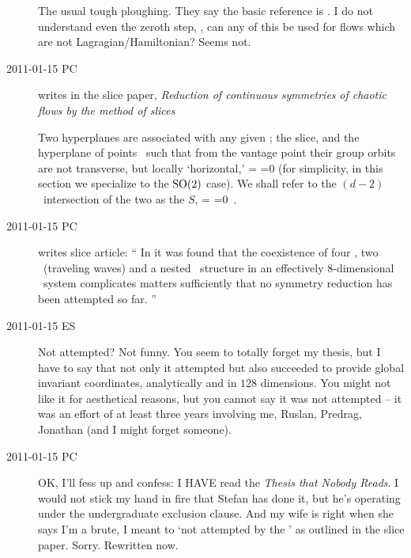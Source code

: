 \begin{description}
The usual tough ploughing. They say the basic reference is .
I do not understand even the zeroth step, \ie, can any of this be used for
flows which are not Lagragian/Hamiltonian? Seems not.

\item[2011-01-15 PC] writes in the slice paper,
{\emph{Reduction of continuous symmetries}} \emph{of chaotic flows by the
method of slices}

Two
hyperplanes are associated with  any given {\template} \slicep; the slice,
and the hyperplane of points \sspSing\ such that from
the {\template} vantage point their group orbits are not transverse, but
locally `horizontal,'
\beq
\braket{\groupTan(\sspSing)}{\sliceTan{}}
 =
\braket{\sspSing}{\Lg^2\slicep}
 =0
(for simplicity, in this section we specialize to the  $\textrm{SO}(2)$ case).
We shall refer to the $(d\!-\!2)$\dmn\ intersection of the two as the
{\em \sset} $S$,
\beq
\braket{\groupTan(\sspRSing)}{\sliceTan{}}
 =
\braket{\sspRSing}{\Lg^2\slicep}
 =0
\,.


\item[2011-01-15 PC] writes slice article: ``
In  it
was found that the coexistence of four \eqva, two \reqva\
(traveling waves) and a
nested \fixedsp\ structure in an effectively $8$-dimensional \KS\ system
complicates matters sufficiently that no symmetry reduction has been
attempted so far.
''

\item[2011-01-15 ES]  Not attempted? Not funny. You seem to
totally forget my thesis, but I have to say that not only it attempted
but also succeeded to provide global invariant coordinates, analytically
and in $128$ dimensions. You might not like it for aesthetical reasons,
but you cannot say it was not attempted -- it was an effort of
at least three years involving me, Ruslan, Predrag, Jonathan (and I might
forget someone).

\item[2011-01-15 PC]
OK, I'll fess up and confess: I HAVE read the
\emph{
           {Thesis that Nobody Reads}}.
I would not stick my hand in fire that Stefan has done it, but he's
operating under the undergraduate exclusion clause. And my wife is right
when she says I'm a brute, I meant to `not attempted by the \mslices' as
outlined in the slice paper. Sorry. Rewritten now.


\end{description}
